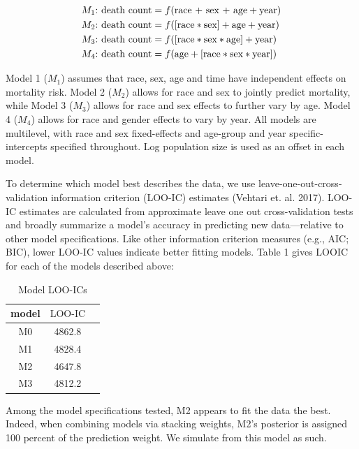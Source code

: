 \documentclass{article}
\begin{document}
	\begin{align*}
		M_1\text{:} & \text{ death count} = f(\text{\text{race} + \text{sex} + age} + \text{year}) \\
		M_2\text{:} & \text{ death count} = f([\text{race}*\text{sex}] + \text{age} + \text{year}) \\
    M_3\text{:} & \text{ death count} = f([\text{race}*\text{sex}*\text{age}] + \text{year})   \\
		M_4\text{:} & \text{ death count} = f(\text{age} + [\text{race}*\text{sex}*\text{year}])   
	\end{align*}

Model 1 ($M_1$) assumes that race, sex, age and time have independent effects on mortality risk. Model 2 ($M_2$) allows for race and sex to jointly predict mortality, while Model 3 ($M_3$) allows for race and sex effects to further vary by age. Model 4 ($M_4$) allows for race and gender effects to vary by year. All models are multilevel, with race and sex fixed-effects and age-group and year specific-intercepts specified throughout. Log population size is used as an offset in each model. 

To determine which model best describes the data, we use leave-one-out-cross-validation information criterion (LOO-IC) estimates (Vehtari et. al. 2017). LOO-IC estimates are calculated from approximate leave one out cross-validation tests and broadly summarize a model's accuracy in predicting new data---relative to other model specifications. Like other information criterion measures (e.g., AIC; BIC), lower LOO-IC values indicate better fitting models. Table 1 gives LOOIC for each of the models described above: 

\begin{table}[H]
\centering
  \begin{tabular}{ccc}
    model & $\text{LOO-IC}$ \\ 
  \hline
    M0 & 4862.8 \\ 
    M1 & 4828.4 \\
    M2 & 4647.8 \\
    M3 & 4812.2 \\
  \hline
  \end{tabular}
  \caption{Model LOO-ICs}
\end{table}

Among the model specifications tested, M2 appears to fit the data the best. Indeed, when combining models via stacking weights, M2's posterior is assigned 100 percent of the prediction weight. We simulate from this model as such. 
\end{document}
